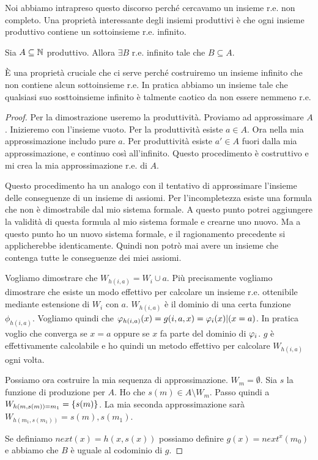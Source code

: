 Noi abbiamo intrapreso questo discorso perché cercavamo un insieme r.e. non completo. Una
proprietà interessante degli insiemi produttivi è che ogni insieme produttivo contiene un
sottoinsieme r.e. infinito.

\begin{thm}
    Sia $A \subseteq \mathbb{N}$ produttivo. Allora $\exists B$ r.e. infinito tale che $B \subseteq A$.
\end{thm}

È una proprietà cruciale che ci serve perché costruiremo un insieme infinito che non contiene
alcun sottoinsieme r.e. In pratica abbiamo un insieme tale che qualsiasi suo sosttoinsieme infinito
è talmente caotico da non essere nemmeno r.e.

\begin{proof}
    Per la dimostrazione useremo la produttività. Proviamo ad approssimare $A$. Inizieremo con l'insieme
    vuoto. Per la produttività esiste $a \in A$. Ora nella mia approssimazione includo pure $a$. Per
    produttività esiste $a' \in A$ fuori dalla mia approssimazione, e continuo così all'infinito. Questo
    procedimento è costruttivo e mi crea la mia approssimazione r.e. di $A$.

    Questo procedimento ha un analogo con il tentativo di approssimare l'insieme delle conseguenze
    di un insieme di assiomi. Per l'incompletezza esiste una formula che non è dimostrabile dal mio
    sistema formale. A questo punto potrei aggiungere la validità di questa formula al mio sistema
    formale e crearne uno nuovo. Ma a questo punto ho un nuovo sistema formale, e il ragionamento
    precedente si applicherebbe identicamente. Quindi non potrò mai avere un insieme che contenga
    tutte le conseguenze dei miei assiomi.

    Vogliamo dimostrare che $W_{h(i,a)} = W_{i} \cup {a}$. Più precisamente vogliamo dimostrare che
    esiste un modo effettivo per calcolare un insieme r.e. ottenibile mediante estensione di $W_{i}$
    con $a$. $W_{h(i,a)}$ è il dominio di una certa funzione $\phi_{h(i,a)}$. Vogliamo quindi che
    $\varphi_{h(i,a)}(x) = g(i,a,x) = \varphi_{i}(x)|(x = a)$. In pratica voglio che converga se $x = a$ oppure se
    $x$ fa parte del dominio di $\varphi_{i}$. $g$ è effettivamente calcolabile e ho quindi un metodo effettivo
    per calcolare $W_{h(i,a)}$ ogni volta.

    Possiamo ora costruire la mia sequenza di approssimazione. $W_{m} = \emptyset$. Sia $s$ la
    funzione di produzione per $A$. Ho che $s(m) \in A \setminus W_{m}$. Passo quindi a
    $W_{h(m,s(m))=m_{1}} = \{s(m)\}$. La mia seconda approssimazione sarà $W_{h(m_{1},s(m_{1}))} =
    {s(m),s(m_{1})}$.

    Se definiamo $\textit{next}(x) = h(x,s(x))$ possiamo definire $g(x) = next^{x}(m_{0})$ e abbiamo
    che $B$ è uguale al codominio di $g$.
\end{proof}

